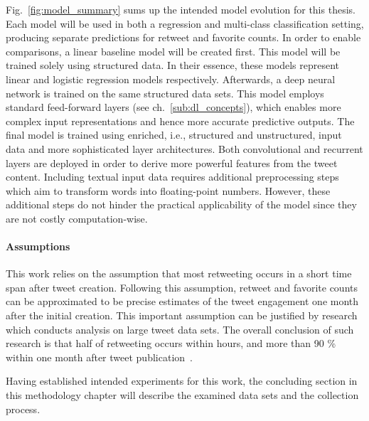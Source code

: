 Fig.~\ref{fig:model_summary} sums up the intended model evolution for this thesis.
Each model will be used in both a regression and multi-class classification
setting, producing separate predictions for retweet and favorite counts.
In order to enable comparisons, a linear baseline model will be created first.
This model will be trained solely using structured data.
In their essence, these models represent linear and logistic regression models
respectively.
Afterwards, a deep neural network is trained on the same structured data sets.
This model employs standard feed-forward layers (see ch.~\ref{sub:dl_concepts}),
which enables more complex input representations and hence more accurate
predictive outputs.
The final model is trained using enriched, i.e., structured and unstructured,
input data and more sophisticated layer architectures.
Both convolutional and recurrent layers are deployed in order to derive more
powerful features from the tweet content. 
Including textual input data requires additional preprocessing steps which aim
to transform words into floating-point numbers.
However, these additional steps do not hinder the practical applicability
of the model since they are not costly computation-wise.

\paragraph{Assumptions}

This work relies on the assumption that most retweeting occurs in a short time
span after tweet creation.
Following this assumption, retweet and favorite counts can be approximated
to be precise estimates of the tweet engagement one month after the initial
creation.
This important assumption can be justified by research which conducts analysis
on large tweet data sets.
The overall conclusion of such research is that half of retweeting occurs within
hours, and more than 90 \% within one month after tweet publication~\cite{Kwak2010, Kupavskii2012, Zaman2014}.

Having established intended experiments for this work, the concluding section
in this methodology chapter will describe the examined data sets and the
collection process.

